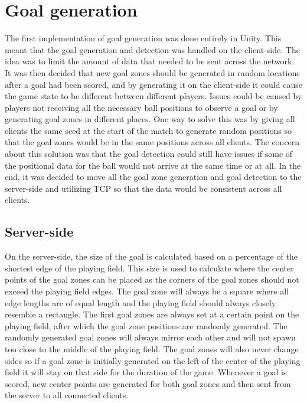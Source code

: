 \section{Goal generation}\label{subsec:goalrefactoring}
The first implementation of goal generation was done entirely in Unity.
This meant that the goal generation and detection was handled on the client-side.
The idea was to limit the amount of data that needed to be sent across the network.
It was then decided that new goal zones should be generated in random locations after a goal had been scored, and by generating it on the client-side it could cause the game state to be different between different players.
Issues could be caused by players not receiving all the necessary ball positions to observe a goal or by generating goal zones in different places.
One way to solve this was by giving all clients the same seed at the start of the match to generate random positions so that the goal zones would be in the same positions across all clients.
The concern about this solution was that the goal detection could still have issues if some of the positional data for the ball would not arrive at the same time or at all.
In the end, it was decided to move all the goal zone generation and goal detection to the server-side and utilizing TCP so that the data would be consistent across all clients.

\subsection{Server-side}
On the server-side, the size of the goal is calculated based on a percentage of the shortest edge of the playing field.
This size is used to calculate where the center points of the goal zones can be placed as the corners of the goal zones should not exceed the playing field edges.
The goal zone will always be a square where all edge lengths are of equal length and the playing field should always closely resemble a rectangle.
The first goal zones are always set at a certain point on the playing field, after which the goal zone positions are randomly generated.
The randomly generated goal zones will always mirror each other and will not spawn too close to the middle of the playing field.
The goal zones will also never change sides so if a goal zone is initially generated on the left of the center of the playing field it will stay on that side for the duration of the game.
Whenever a goal is scored, new center points are generated for both goal zones and then sent from the server to all connected clients.

